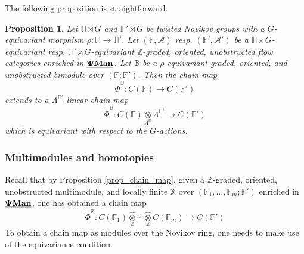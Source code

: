 \documentclass[reqno, 10pt]{amsart}
\numberwithin{equation}{section}
\numberwithin{equation}{section}
\newtheorem{prop}[thm]{Proposition}
\theoremstyle{definition}
\theoremstyle{remark}
\newcommand{\beqn}{\begin{equation*}}
\newcommand{\eeqn}{\end{equation*}}
\newcommand{\mb}{\mathbb}
\newcommand{\mc}{\mathcal}
\newcommand{\pman}{\uds{{\bf \Psi}{\bf Man}}}
\newcommand{\uds}[1]{\underline{\smash{#1}}}
\begin{document}
The following proposition is straightforward.

\begin{prop}\label{prop_equivariant_chain_map}
Let $\mb\Pi \rtimes G$ and $\mb\Pi' \rtimes G$ be twisted Novikov groups with a $G$-equivariant morphism $\rho: \mb\Pi \to \mb\Pi'$. Let $({\mb F}, {\mc A})$ resp. $({\mb F}', {\mc A}')$ be a $\mb\Pi\rtimes G$-equivariant resp. $\mb\Pi' \rtimes G$-equivariant ${\mb Z}$-graded, oriented, unobstructed flow categories enriched in $\pman$. Let ${\mb B}$ be a $\rho$-equivariant graded, oriented, and unobstructed bimodule over $({\mb F}; {\mb F}')$. Then the chain map
\beqn
\tilde{\Phi}^{\mb B}: C ({\mb F}) \to C ({\mb F}')
\eeqn
extends to a $\Lambda^{{\mb \Pi}'}$-linear chain map
\beqn
\tilde \Phi^{\mb B}: C({\mb F}) \underset{\Lambda^{\mb\Pi}}{\otimes} \Lambda^{{\mb \Pi}'} \to C({\mb F}')
\eeqn
which is equivariant with respect to the $G$-actions.
\end{prop}







\subsubsection{Multimodules and homotopies}

Recall that by Proposition \ref{prop_chain_map}, given a ${\mb Z}$-graded, oriented, unobstructed multimodule, and locally finite ${\mb X}$ over $({\mb F}_1, \ldots, {\mb F}_m; {\mb F}')$ enriched in $\pman$, one has obtained a chain map 
\beqn
\tilde\Phi^{\mb X}: C ({\mb F}_1) \widehat{\underset{\mb Z}{\otimes}} \cdots \widehat{\underset{\mb Z}{\otimes}} C ({\mb F}_m) \to C({\mb F}')
\eeqn
To obtain a chain map as modules over the Novikov ring, one needs to make use of the equivariance condition. 
\end{document}
